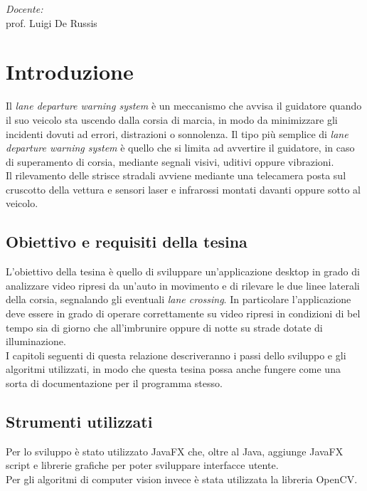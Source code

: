 \documentclass[12pt]{article}
\makeatletter
\let\thedate\@date
\makeatother
\begin{document}
\begin{titlepage}
	{\large \emph{Docente:} \\
    prof. Luigi De Russis}\\[1.5cm]
	{\large \thedate}
 
	\vfill
	
\end{titlepage}




\section{Introduzione}
\hspace{0.2 cm} Il \textit{lane departure warning system} è un meccanismo che avvisa il guidatore quando il suo veicolo sta uscendo dalla corsia di marcia, in modo da minimizzare gli incidenti dovuti ad errori, distrazioni o sonnolenza.
Il tipo più semplice di \textit{lane departure warning system} è quello che si limita ad avvertire il guidatore, in caso di superamento di corsia, mediante segnali visivi, uditivi oppure vibrazioni.\\
Il rilevamento delle strisce stradali avviene mediante una telecamera posta sul cruscotto della vettura e sensori laser e infrarossi montati davanti oppure sotto al veicolo.

\subsection{Obiettivo e requisiti della tesina}
\hspace{0.2 cm} L'obiettivo della tesina è quello di sviluppare un'applicazione desktop in grado di analizzare video ripresi da un'auto in movimento e di rilevare le due linee laterali della corsia, segnalando gli eventuali \textit{lane crossing}.
In particolare l'applicazione deve essere in grado di operare correttamente su video ripresi in condizioni di bel tempo sia di giorno che all'imbrunire oppure di notte su strade dotate di illuminazione. \\
I capitoli seguenti di questa relazione descriveranno i passi dello sviluppo e gli algoritmi utilizzati, in modo che questa tesina possa anche fungere come una sorta di documentazione per il programma stesso.

\subsection{Strumenti utilizzati}
\hspace{0.2 cm} Per lo sviluppo è stato utilizzato JavaFX che, oltre al Java, aggiunge JavaFX script e librerie grafiche per poter sviluppare interfacce utente.\\
Per gli algoritmi di computer vision invece è stata utilizzata la libreria OpenCV.
\end{document}
